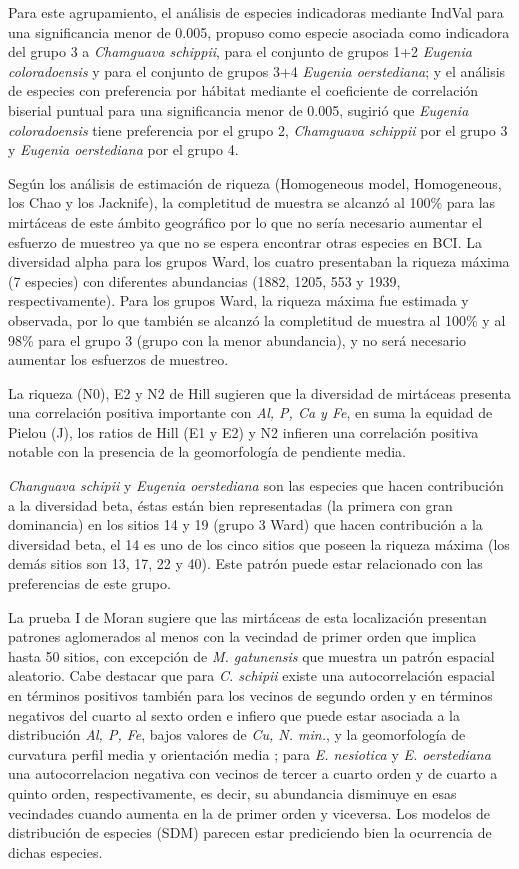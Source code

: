 \documentclass[11pt,]{article}
\begin{document}
Para este agrupamiento, el análisis de especies indicadoras mediante
IndVal para una significancia menor de 0.005, propuso como especie
asociada como indicadora del grupo 3 a \emph{Chamguava schippii}, para
el conjunto de grupos 1+2 \emph{Eugenia coloradoensis} y para el
conjunto de grupos 3+4 \emph{Eugenia oerstediana}; y el análisis de
especies con preferencia por hábitat mediante el coeficiente de
correlación biserial puntual para una significancia menor de 0.005,
sugirió que \emph{Eugenia coloradoensis} tiene preferencia por el grupo
2, \emph{Chamguava schippii} por el grupo 3 y \emph{Eugenia oerstediana}
por el grupo 4.

Según los análisis de estimación de riqueza (Homogeneous model,
Homogeneous, los Chao y los Jacknife), la completitud de muestra se
alcanzó al 100\% para las mirtáceas de este ámbito geográfico por lo que
no sería necesario aumentar el esfuerzo de muestreo ya que no se espera
encontrar otras especies en BCI. La diversidad alpha para los grupos
Ward, los cuatro presentaban la riqueza máxima (7 especies) con
diferentes abundancias (1882, 1205, 553 y 1939, respectivamente). Para
los grupos Ward, la riqueza máxima fue estimada y observada, por lo que
también se alcanzó la completitud de muestra al 100\% y al 98\% para el
grupo 3 (grupo con la menor abundancia), y no será necesario aumentar
los esfuerzos de muestreo.

La riqueza (N0), E2 y N2 de Hill sugieren que la diversidad de mirtáceas
presenta una correlación positiva importante con \emph{Al, P, Ca y Fe},
en suma la equidad de Pielou (J), los ratios de Hill (E1 y E2) y N2
infieren una correlación positiva notable con la presencia de la
geomorfología de pendiente media.

\emph{Changuava schipii} y \emph{Eugenia oerstediana} son las especies
que hacen contribución a la diversidad beta, éstas están bien
representadas (la primera con gran dominancia) en los sitios 14 y 19
(grupo 3 Ward) que hacen contribución a la diversidad beta, el 14 es uno
de los cinco sitios que poseen la riqueza máxima (los demás sitios son
13, 17, 22 y 40). Este patrón puede estar relacionado con las
preferencias de este grupo.

La prueba I de Moran sugiere que las mirtáceas de esta localización
presentan patrones aglomerados al menos con la vecindad de primer orden
que implica hasta 50 sitios, con excepción de \emph{M. gatunensis} que
muestra un patrón espacial aleatorio. Cabe destacar que para \emph{C.
schipii} existe una autocorrelación espacial en términos positivos
también para los vecinos de segundo orden y en términos negativos del
cuarto al sexto orden e infiero que puede estar asociada a la
distribución \emph{Al, P, Fe}, bajos valores de \emph{Cu, N. min.}, y la
geomorfología de curvatura perfil media y orientación media ; para
\emph{E. nesiotica} y \emph{E. oerstediana} una autocorrelacion negativa
con vecinos de tercer a cuarto orden y de cuarto a quinto orden,
respectivamente, es decir, su abundancia disminuye en esas vecindades
cuando aumenta en la de primer orden y viceversa. Los modelos de
distribución de especies (SDM) parecen estar prediciendo bien la
ocurrencia de dichas especies.
\end{document}
